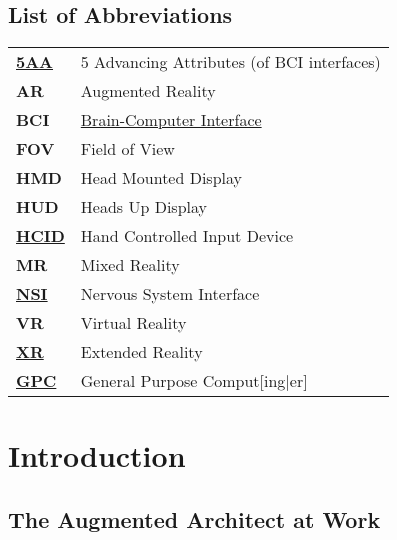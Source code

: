 \documentclass[logo,bsc,singlespacing,parskip]{infthesis}
\begin{document}
\begin{preliminary}
\iffalse %

\part{List of Abbreviations}
\label{sec:org0d52d29}
\fi
\chapter*{List of Abbreviations}
\label{sec:org93134e0}
\begin{center}
\begin{tabular}{ll}
\textbf{\hyperref[orgafbfd0c]{5AA}} & 5 Advancing Attributes (of BCI interfaces)\\
\textbf{AR} & Augmented Reality\\
\textbf{BCI} & \hyperref[org89a0382]{Brain-Computer Interface}\\
\textbf{FOV} & Field of View\\
\textbf{HMD} & Head Mounted Display\\
\textbf{HUD} & Heads Up Display\\
\textbf{\hyperref[org30e2275]{HCID}} & Hand Controlled Input Device\\
\textbf{MR} & Mixed Reality\\
\textbf{\hyperref[org5662848]{NSI}} & Nervous System Interface\\
\textbf{VR} & Virtual Reality\\
\textbf{\hyperref[orgf7f8e78]{XR}} & Extended Reality\\
\textbf{\hyperref[orgb3382ea]{GPC}} & General Purpose Comput[ing\(\vert{}\)er]\\
\end{tabular}

\end{center}

\setcounter{tocdepth}{1}
\tableofcontents
{}
\listoffigures
\listoftables
\end{preliminary}


\part*{Introduction}
\label{sec:org9134d7c}
\chapter*{The Augmented Architect at Work}
\label{sec:org3bf9639}
\end{document}
